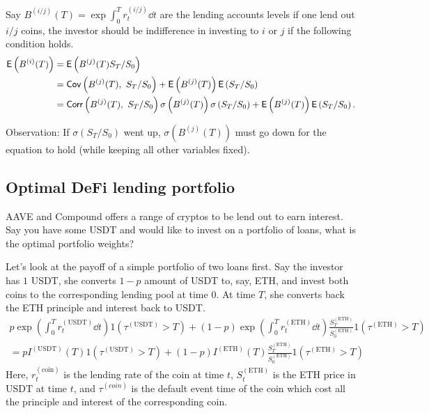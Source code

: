 \documentclass[square]{article} %
\theoremstyle{plain}
\theoremstyle{definition} %
\begin{document}
Say $B^{(i/j)}(T) = \exp\int_0^T r^{(i/j)}_t \dd t$ are the lending accounts levels if one lend out $i/j$ coins, 
 the investor should be indifference in investing to $i$ or $j$ if the following condition holds.
 \begin{align*}
  \mathbb{\sf E}\left(B^{(i)}(T)\right) 
  &= \mathbb{\sf E}\left(B^{(j)}(T)S_T/S_0\right)\\
  &= \mathbb{\sf Cov}\left(B^{(j)}(T),\ S_T/S_0\right) + \mathbb{\sf E}\left(B^{(j)}(T)\right)\mathbb{\sf E}\left(S_T/S_0\right)\\
  &= \mathbb{\sf Corr}\left(B^{(j)}(T),\ S_T/S_0\right) \sigma\left(B^{(j)}(T)\right) \sigma\left(S_T/S_0\right) + \mathbb{\sf E}\left(B^{(j)}(T)\right)\mathbb{\sf E}\left(S_T/S_0\right).
\end{align*}

Observation: If $\sigma\left(S_T/S_0\right)$ went up, $\sigma\left(B^{(j)}(T)\right)$ must go down for the equation to hold (while keeping all other variables fixed).

\subsection{Optimal DeFi lending portfolio}
AAVE and Compound offers a range of cryptos to be lend out to earn interest. 
 Say you have some USDT and would like to invest on a portfolio of loans, what is the optimal portfolio weights?

Let's look at the payoff of a simple portfolio of two loans first.
 Say the investor has $1$ USDT, she converts $1-p$ amount of USDT to, say, ETH, and invest both coins to the corresponding lending pool at time $0$. 
 At time $T$, she converts back the ETH principle and interest back to USDT. 
\begin{align*}
p\exp\left(\int_0^T r^{(\text{USDT})}_t \dd t\right) 1(\tau^{(\text{USDT})} > T) 
+ (1-p)\exp\left(\int_0^T r^{(\text{ETH})}_t \dd t\right)\frac{S^{(\text{ETH})}_T}{S^{(\text{ETH})}_0}1(\tau^{(\text{ETH})} > T)\\
= p I^{(\text{USDT})}(T)1(\tau^{(\text{USDT})} > T)  + (1-p)I^{(\text{ETH})}(T)\frac{S^{(\text{ETH})}_T}{S^{(\text{ETH})}_0}1(\tau^{(\text{ETH})} > T)
 \end{align*}
 Here,  $r^{(\text{coin})}_t$ is the lending rate of the coin at time $t$, $S^{(\text{ETH})}_t$ is the ETH price in USDT at time $t$, and 
 $\tau^{(coin)}$ is the default event time of the coin which cost all the principle and interest of the corresponding coin. 
\end{document}
